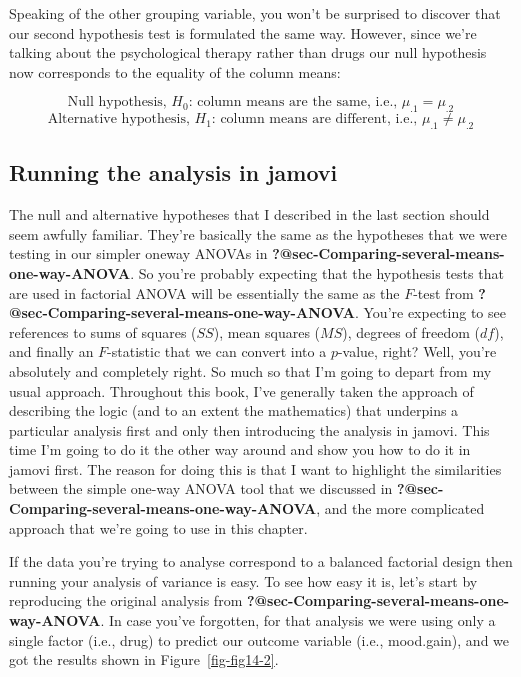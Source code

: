 \documentclass[
  a4paper,
]{book}
\begin{document}
Speaking of the other grouping variable, you won't be surprised to
discover that our second hypothesis test is formulated the same way.
However, since we're talking about the psychological therapy rather than
drugs our null hypothesis now corresponds to the equality of the column
means:

\[\text{Null hypothesis, } H_0 \text{: column means are the same, i.e., } \mu_{ .1} = \mu_{ .2} \]
\[\text{Alternative hypothesis, } H_1 \text{: column means are different, i.e., } \mu_{ .1} \neq \mu_{ .2}\]

\hypertarget{running-the-analysis-in-jamovi}{%
\subsection{Running the analysis in
jamovi}\label{running-the-analysis-in-jamovi}}

The null and alternative hypotheses that I described in the last section
should seem awfully familiar. They're basically the same as the
hypotheses that we were testing in our simpler oneway ANOVAs in
\textbf{?@sec-Comparing-several-means-one-way-ANOVA}. So you're probably
expecting that the hypothesis tests that are used in factorial ANOVA
will be essentially the same as the \(F\)-test from
\textbf{?@sec-Comparing-several-means-one-way-ANOVA}. You're expecting
to see references to sums of squares (\(SS\)), mean squares (\(MS\)),
degrees of freedom (\(df\)), and finally an \(F\)-statistic that we can
convert into a \(p\)-value, right? Well, you're absolutely and
completely right. So much so that I'm going to depart from my usual
approach. Throughout this book, I've generally taken the approach of
describing the logic (and to an extent the mathematics) that underpins a
particular analysis first and only then introducing the analysis in
jamovi. This time I'm going to do it the other way around and show you
how to do it in jamovi first. The reason for doing this is that I want
to highlight the similarities between the simple one-way ANOVA tool that
we discussed in \textbf{?@sec-Comparing-several-means-one-way-ANOVA},
and the more complicated approach that we're going to use in this
chapter.

If the data you're trying to analyse correspond to a balanced factorial
design then running your analysis of variance is easy. To see how easy
it is, let's start by reproducing the original analysis from
\textbf{?@sec-Comparing-several-means-one-way-ANOVA}. In case you've
forgotten, for that analysis we were using only a single factor (i.e.,
drug) to predict our outcome variable (i.e., mood.gain), and we got the
results shown in Figure~\ref{fig-fig14-2}.
\end{document}

